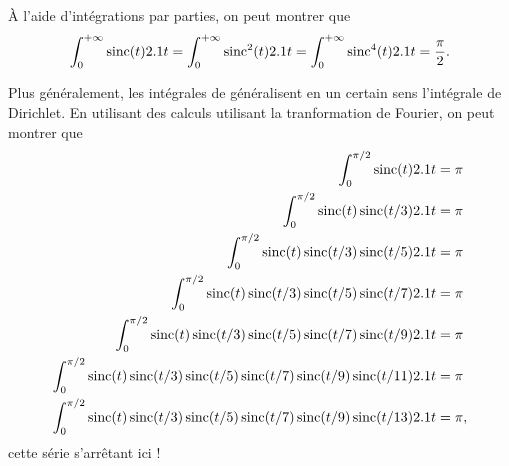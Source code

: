 À l'aide d'intégrations par parties, on peut montrer que
\[
\int_0^{+\infty} \sinc(t) \d t
= \int_0^{+\infty} \sinc^2(t) \d t
= \int_0^{+\infty} \sinc^4(t) \d t
= \frac{\pi}{2}.
\]

Plus généralement, les intégrales de \cite{Browein} généralisent en un certain sens l'intégrale de Dirichlet. En utilisant des calculs utilisant la tranformation de Fourier, on peut montrer que
\begin{align*}
\int_0^{\pi/2} \sinc(t) \d t &= \pi\\
\int_0^{\pi/2} \sinc(t) \sinc(t/3) \d t &= \pi\\
\int_0^{\pi/2} \sinc(t) \sinc(t/3) \sinc(t/5) \d t &= \pi\\
\int_0^{\pi/2} \sinc(t) \sinc(t/3) \sinc(t/5) \sinc(t/7) \d t &= \pi\\
\int_0^{\pi/2} \sinc(t) \sinc(t/3) \sinc(t/5) \sinc(t/7) \sinc(t/9) \d t &= \pi\\
\int_0^{\pi/2} \sinc(t) \sinc(t/3) \sinc(t/5) \sinc(t/7) \sinc(t/9) \sinc(t/11) \d t &= \pi\\
\int_0^{\pi/2} \sinc(t) \sinc(t/3) \sinc(t/5) \sinc(t/7) \sinc(t/9) \sinc(t/13) \d t &= \pi,
\end{align*}
cette série s'arrêtant ici ! 
